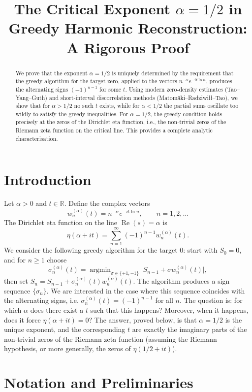 \documentclass[12pt,a4paper]{article}
\title{The Critical Exponent $\alpha = 1/2$ in Greedy Harmonic Reconstruction: A Rigorous Proof}
\author{}
\date{}
\begin{document}
\maketitle

\begin{abstract}
We prove that the exponent $\alpha = 1/2$ is uniquely determined by the requirement that the greedy algorithm for the target zero, applied to the vectors $n^{-\alpha}e^{-it\ln n}$, produces the alternating signs $(-1)^{n-1}$ for some $t$. Using modern zero‑density estimates (Tao–Yang–Guth) and short‑interval discorrelation methods (Matomäki–Radziwiłł–Tao), we show that for $\alpha > 1/2$ no such $t$ exists, while for $\alpha < 1/2$ the partial sums oscillate too wildly to satisfy the greedy inequalities. For $\alpha = 1/2$, the greedy condition holds precisely at the zeros of the Dirichlet eta function, i.e., the non‑trivial zeros of the Riemann zeta function on the critical line. This provides a complete analytic characterisation.
\end{abstract}

\section{Introduction}

Let $\alpha > 0$ and $t \in \mathbb{R}$. Define the complex vectors
\[
w_n^{(\alpha)}(t) = n^{-\alpha} e^{-i t \ln n}, \qquad n = 1,2,\dots
\]
The Dirichlet eta function on the line $\operatorname{Re}(s)=\alpha$ is
\[
\eta(\alpha+it) = \sum_{n=1}^{\infty} (-1)^{n-1} w_n^{(\alpha)}(t).
\]
We consider the following greedy algorithm for the target $0$: start with $S_0 = 0$, and for $n \ge 1$ choose
\[
\sigma_n^{(\alpha)}(t) = \operatorname{argmin}_{\sigma \in \{+1,-1\}} \bigl| S_{n-1} + \sigma w_n^{(\alpha)}(t) \bigr|,
\]
then set $S_n = S_{n-1} + \sigma_n^{(\alpha)}(t) w_n^{(\alpha)}(t)$. The algorithm produces a sign sequence $\{\sigma_n\}$. We are interested in the case where this sequence coincides with the alternating signs, i.e. $\sigma_n^{(\alpha)}(t) = (-1)^{n-1}$ for all $n$. The question is: for which $\alpha$ does there exist a $t$ such that this happens? Moreover, when it happens, does it force $\eta(\alpha+it)=0$? The answer, proved below, is that $\alpha = 1/2$ is the unique exponent, and the corresponding $t$ are exactly the imaginary parts of the non‑trivial zeros of the Riemann zeta function (assuming the Riemann hypothesis, or more generally, the zeros of $\eta(1/2+it)$).

\section{Notation and Preliminaries}
\end{document}
